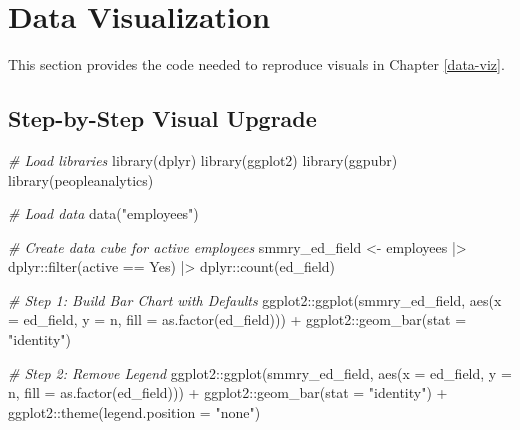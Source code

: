\documentclass[
]{book}
\newenvironment{Shaded}{\begin{snugshade}}{\end{snugshade}}
\newcommand{\AttributeTok}[1]{\textcolor[rgb]{0.77,0.63,0.00}{#1}}
\newcommand{\CommentTok}[1]{\textcolor[rgb]{0.56,0.35,0.01}{\textit{#1}}}
\newcommand{\FunctionTok}[1]{\textcolor[rgb]{0.00,0.00,0.00}{#1}}
\newcommand{\NormalTok}[1]{#1}
\newcommand{\OtherTok}[1]{\textcolor[rgb]{0.56,0.35,0.01}{#1}}
\newcommand{\SpecialCharTok}[1]{\textcolor[rgb]{0.00,0.00,0.00}{#1}}
\newcommand{\StringTok}[1]{\textcolor[rgb]{0.31,0.60,0.02}{#1}}
\begin{document}
\hypertarget{data-visualization}{%
\section{Data Visualization}\label{data-visualization}}

This section provides the code needed to reproduce visuals in Chapter \ref{data-viz}.

\hypertarget{step-by-step-visual-upgrade-1}{%
\subsection{Step-by-Step Visual Upgrade}\label{step-by-step-visual-upgrade-1}}

\begin{Shaded}
\begin{Highlighting}[]
\CommentTok{\# Load libraries}
\FunctionTok{library}\NormalTok{(dplyr)}
\FunctionTok{library}\NormalTok{(ggplot2)}
\FunctionTok{library}\NormalTok{(ggpubr)}
\FunctionTok{library}\NormalTok{(peopleanalytics)}

\CommentTok{\# Load data}
\FunctionTok{data}\NormalTok{(}\StringTok{"employees"}\NormalTok{)}

\CommentTok{\# Create data cube for active employees}
\NormalTok{smmry\_ed\_field }\OtherTok{\textless{}{-}}\NormalTok{ employees }\SpecialCharTok{|\textgreater{}}
\NormalTok{                  dplyr}\SpecialCharTok{::}\FunctionTok{filter}\NormalTok{(active }\SpecialCharTok{==} \StringTok{\textquotesingle{}Yes\textquotesingle{}}\NormalTok{) }\SpecialCharTok{|\textgreater{}}
\NormalTok{                  dplyr}\SpecialCharTok{::}\FunctionTok{count}\NormalTok{(ed\_field)}

\CommentTok{\# Step 1: Build Bar Chart with Defaults}
\NormalTok{ggplot2}\SpecialCharTok{::}\FunctionTok{ggplot}\NormalTok{(smmry\_ed\_field, }\FunctionTok{aes}\NormalTok{(}\AttributeTok{x =}\NormalTok{ ed\_field, }\AttributeTok{y =}\NormalTok{ n, }\AttributeTok{fill =} \FunctionTok{as.factor}\NormalTok{(ed\_field))) }\SpecialCharTok{+}
\NormalTok{ggplot2}\SpecialCharTok{::}\FunctionTok{geom\_bar}\NormalTok{(}\AttributeTok{stat =} \StringTok{"identity"}\NormalTok{) }

\CommentTok{\# Step 2: Remove Legend}
\NormalTok{ggplot2}\SpecialCharTok{::}\FunctionTok{ggplot}\NormalTok{(smmry\_ed\_field, }\FunctionTok{aes}\NormalTok{(}\AttributeTok{x =}\NormalTok{ ed\_field, }\AttributeTok{y =}\NormalTok{ n, }\AttributeTok{fill =} \FunctionTok{as.factor}\NormalTok{(ed\_field))) }\SpecialCharTok{+}
\NormalTok{ggplot2}\SpecialCharTok{::}\FunctionTok{geom\_bar}\NormalTok{(}\AttributeTok{stat =} \StringTok{"identity"}\NormalTok{) }\SpecialCharTok{+}
\NormalTok{ggplot2}\SpecialCharTok{::}\FunctionTok{theme}\NormalTok{(}\AttributeTok{legend.position =} \StringTok{"none"}\NormalTok{)}


\end{Highlighting}
\end{Shaded}
\end{document}

